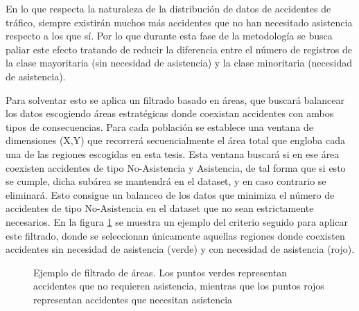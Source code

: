 En lo que respecta la naturaleza de la distribución de datos de accidentes de tráfico, siempre existirán muchos más accidentes que no han necesitado asistencia respecto a los que sí. Por lo que durante esta fase de la metodología se busca paliar este efecto tratando de reducir la diferencia entre el número de registros de la clase mayoritaria (sin necesidad de asistencia) y la clase minoritaria (necesidad de asistencia).

Para solventar esto se aplica un filtrado basado en áreas, que buscará balancear los datos escogiendo áreas estratégicas donde coexistan accidentes con ambos tipos de consecuencias. Para cada población se establece una ventana de dimensiones (X,Y) que recorrerá secuencialmente el área total que engloba cada una de las regiones escogidas en esta tesis. Esta ventana buscará si en ese área coexisten accidentes de tipo No-Asistencia y Asistencia, de tal forma que si esto se cumple, dicha subárea se mantendrá en el dataset, y en caso contrario se eliminará. Esto consigue un balanceo de los datos que minimiza el número de accidentes de tipo No-Asistencia en el dataset que no sean estrictamente necesarios. En la figura \ref{Areas} se muestra un ejemplo del criterio seguido para aplicar este filtrado, donde se seleccionan únicamente aquellas regiones donde coexisten accidentes sin necesidad de asistencia (verde) y con necesidad de asistencia (rojo).

\begin{figure}[H]
	\centering    
	\caption{Ejemplo de filtrado de áreas. Los puntos verdes representan accidentes que no requieren asistencia, mientras que los puntos rojos representan accidentes que necesitan asistencia}
	\label{Areas}
\end{figure}


